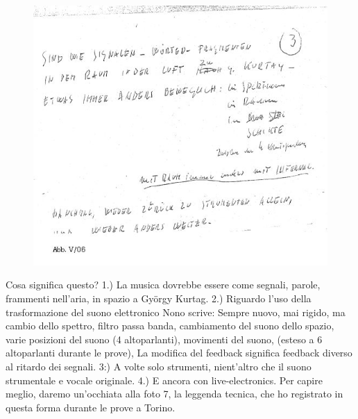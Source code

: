 \begin{figure}[htbp]
\begin{center}
\includegraphics[width=1\textwidth]{images/nono/hph/ab_v_06.jpg}
\caption{}
\label{hph-img6}
\end{center}
\end{figure}

Cosa significa questo? 
1.) La musica dovrebbe essere come segnali, parole, frammenti nell'aria, in 
spazio a György Kurtag. 
2.) Riguardo l'uso della trasformazione del suono elettronico Nono scrive: 
Sempre nuovo, mai rigido, ma 
cambio dello spettro, filtro passa banda, 
cambiamento del suono dello spazio, varie posizioni del suono (4 altoparlanti), movimenti del suono, (esteso a 6 altoparlanti durante le prove), 
La modifica del feedback significa feedback diverso al ritardo dei segnali. 
3:) A volte solo strumenti, nient'altro che il suono strumentale e vocale originale. 
4.) E ancora con live-electronics. 
Per capire meglio, daremo un'occhiata alla foto 7, la leggenda tecnica, che ho registrato in questa forma durante le prove a Torino. 

